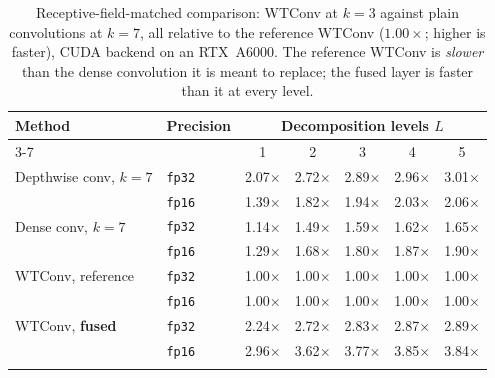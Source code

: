 \begin{table}[t]
\centering
\caption{Receptive-field-matched comparison: WTConv at $k{=}3$ against plain convolutions at $k{=}7$, all relative to the reference WTConv ($1.00\times$; higher is faster), CUDA backend on an RTX~A6000. The reference WTConv is \emph{slower} than the dense convolution it is meant to replace; the fused layer is faster than it at every level.}
\label{tab:rfmatch}
\begin{tabular}{llccccc}
\toprule
\multirow{2}{*}{Method} & \multirow{2}{*}{Precision} & \multicolumn{5}{c}{Decomposition levels $L$} \\
\cmidrule(lr){3-7}
 & & 1 & 2 & 3 & 4 & 5 \\
\midrule
Depthwise conv, $k{=}7$ & \texttt{fp32} & 2.07$\times$ & 2.72$\times$ & 2.89$\times$ & 2.96$\times$ & 3.01$\times$ \\
 & \texttt{fp16} & 1.39$\times$ & 1.82$\times$ & 1.94$\times$ & 2.03$\times$ & 2.06$\times$ \\
\addlinespace[2pt]
Dense conv, $k{=}7$ & \texttt{fp32} & 1.14$\times$ & 1.49$\times$ & 1.59$\times$ & 1.62$\times$ & 1.65$\times$ \\
 & \texttt{fp16} & 1.29$\times$ & 1.68$\times$ & 1.80$\times$ & 1.87$\times$ & 1.90$\times$ \\
\addlinespace[2pt]
WTConv, reference & \texttt{fp32} & 1.00$\times$ & 1.00$\times$ & 1.00$\times$ & 1.00$\times$ & 1.00$\times$ \\
 & \texttt{fp16} & 1.00$\times$ & 1.00$\times$ & 1.00$\times$ & 1.00$\times$ & 1.00$\times$ \\
\addlinespace[2pt]
WTConv, \textbf{fused} & \texttt{fp32} & 2.24$\times$ & 2.72$\times$ & 2.83$\times$ & 2.87$\times$ & 2.89$\times$ \\
 & \texttt{fp16} & 2.96$\times$ & 3.62$\times$ & 3.77$\times$ & 3.85$\times$ & 3.84$\times$ \\
\addlinespace[2pt]
\bottomrule
\end{tabular}
\end{table}
